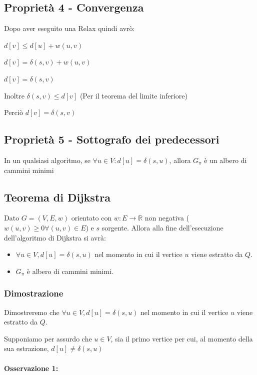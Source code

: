 \documentclass[11pt,a4paper,twoside,openright]{book}
\providecommand{\tightlist}{\setlength{\itemsep}{0pt}\setlength{\parskip}{0pt}}
\let\oldparagraph\paragraph
\renewcommand{\paragraph}[1]{\oldparagraph{#1}\mbox{}}
\begin{document}
{{\subsection{Proprietà 4 - Convergenza}

{Dopo aver eseguito una Relax quindi avrò:}

$d[v] \leq d[u] + w(u,v)$

$d[v] = \delta(s,v) + w(u,v)$

$d[v] = \delta(s,v)$ 

Inoltre $\delta(s,v) \leq d[v]$ (Per il teorema del limite inferiore)

Perciò $d[v]=\delta(s,v)$

\subsection{Proprietà 5 - Sottografo dei predecessori}

{In un qualsiasi algoritmo, se $\forall u \in V: d[u] = \delta(s,u)$, allora $G_\pi$ è un albero di cammini minimi}

\subsection{Teorema di Dijkstra}

{Dato $G=(V,E,w)$ orientato con $w:E\rightarrow \mathbb{R}$ non negativa ($w(u,v) \geq 0 \forall (u,v) \in E$) e $s$ sorgente. Allora alla fine dell'esecuzione dell'algoritmo di Dijkstra si avrà:}

\begin{itemize}
\tightlist
\item
{$\forall u \in V, d[u]=\delta(s,u)$ nel momento in cui il vertice $u$ viene estratto da $Q$.}
\item
{$G_\pi$ è albero di cammini minimi.}
\end{itemize}

\subsubsection{Dimostrazione}

{Dimostreremo che $\forall u \in V, d[u]=\delta(s,u)$ nel momento in cui il vertice $u$ viene estratto da $Q$.}

{Supponiamo per assurdo che $u\in V$, sia il primo vertice per cui, al momento della sua estrazione, $d[u] \neq \delta(s,u)$}

\paragraph{Osservazione 1:}

}}
\end{document}
